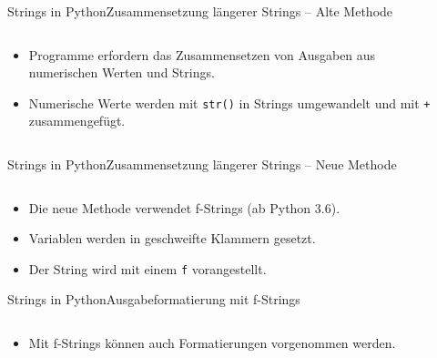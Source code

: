 \documentclass[xelatex,aspectratio=169]{beamer}
\begin{document}
\begin{frame}{Strings in Python}{Zusammensetzung längerer Strings -- Alte Methode}
    \begin{columns}
        \begin{column}{0.5\textwidth}
            \begin{itemize}
                \item Programme erfordern das Zusammensetzen von Ausgaben aus numerischen Werten und Strings.
                \item Numerische Werte werden mit \texttt{str()} in Strings umgewandelt und mit \texttt{+} zusammengefügt.
            \end{itemize}
        \end{column}
        \begin{column}{0.5\textwidth}
            \inputminted{python}{src/strings_concat_long_old.py}
        \end{column}
    \end{columns}

\end{frame}

\begin{frame}{Strings in Python}{Zusammensetzung längerer Strings -- Neue Methode}
    \inputminted{python}{src/strings_concat_long_new.py}
    \begin{itemize}
        \item Die neue Methode verwendet f-Strings (ab Python 3.6).
        \item Variablen werden in geschweifte Klammern gesetzt.
        \item Der String wird mit einem \texttt{f} vorangestellt.
    \end{itemize}
\end{frame}

\begin{frame}{Strings in Python}{Ausgabeformatierung mit f-Strings}
    \inputminted{python}{src/strings_concat_long_new_float.py}
    \begin{itemize}
        \item Mit f-Strings können auch Formatierungen vorgenommen werden.
    \end{itemize}
\end{frame}

\end{document}

